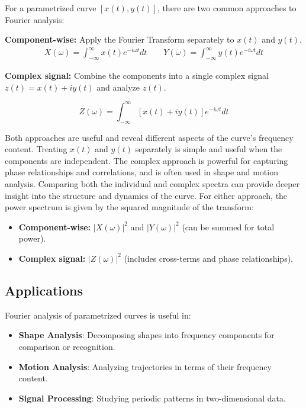 \documentclass[11pt,a4paper]{article}
\begin{document}
For a parametrized curve $[x(t), y(t)]$, there are two common approaches to Fourier analysis:


\textbf{Component-wise:} Apply the Fourier Transform separately to $x(t)$ and $y(t)$.
\begin{equation}
\begin{gathered}
X(\omega) = \int_{-\infty}^{\infty} x(t) e^{-i\omega t} dt \qquad
Y(\omega) = \int_{-\infty}^{\infty} y(t) e^{-i\omega t} dt
\end{gathered}
\end{equation}


\textbf{Complex signal:} Combine the components into a single complex signal $z(t) = x(t) + i y(t)$ and analyze $z(t)$.

\begin{equation}
Z(\omega) = \int_{-\infty}^{\infty} [x(t) + i y(t)] e^{-i\omega t} dt
\end{equation}

Both approaches are useful and reveal different aspects of the curve's frequency content. Treating $x(t)$ and $y(t)$ separately is simple and useful when the components are independent. The complex approach is powerful for capturing phase relationships and correlations, and is often used in shape and motion analysis. Comparing both the individual and complex spectra can provide deeper insight into the structure and dynamics of the curve. For either approach, the power spectrum is given by the squared magnitude of the transform:

\begin{itemize}
    \item \textbf{Component-wise:} $|X(\omega)|^2$ and $|Y(\omega)|^2$ (can be summed for total power).
    \item \textbf{Complex signal:} $|Z(\omega)|^2$ (includes cross-terms and phase relationships).
\end{itemize}

\subsection{Applications}

Fourier analysis of parametrized curves is useful in:
\begin{itemize}
    \item \textbf{Shape Analysis}: Decomposing shapes into frequency components for comparison or recognition.
    \item \textbf{Motion Analysis}: Analyzing trajectories in terms of their frequency content.
    \item \textbf{Signal Processing}: Studying periodic patterns in two-dimensional data.
\end{itemize}
\end{document}
